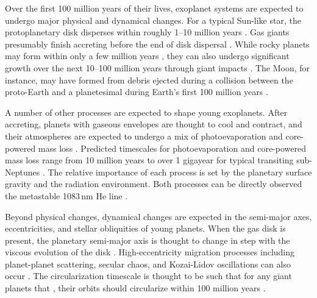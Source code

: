 \documentclass[12pt,twocolumn,tighten]{aastex63}
\begin{document}
Over the first 100 million years of their lives, exoplanet systems are
expected to undergo major physical and dynamical changes.  For a
typical Sun-like star, the protoplanetary disk disperses within
roughly 1--10 million years
\citep{mamajek_initial_2009,fedele_timescale_2010,dullemond_inner_2010,williams_protoplanetary_2011}.
Gas giants presumably finish accreting before the end of disk
dispersal \citep{pollack_formation_1996}.  While rocky planets may
form within only a few million years \citep{dauphas_hf-w-th_2011},
they can also undergo significant growth over the next 10--100 million
years through giant impacts \citep[{\it
e.g.},][]{kleine_hf-w_2009,konig_earths_2011,morbidelli_building_2012,raymond_terrestrial_2014}.
The Moon, for instance, may have formed from debris ejected during a
collision between the proto-Earth and a planetesimal during Earth's
first 100 million years
\citep{cameron_origin_1976,canup_origin_2001,touboul_late_2007}.

A number of other processes are expected to shape young exoplanets.
After accreting, planets with gaseous envelopes are thought to cool
and contract, and their atmospheres are expected to undergo a mix of
photoevaporation and core-powered mass loss \citep[{\it
e.g.},][]{Fortney_et_al_2007,Owen_Wu_2013,Fulton_et_al_2017,gupta_sculpting_2019,gupta_signatures_2020}.
Predicted timescales for photoevaporation and core-powered mass loss
range from 10 million years to over 1 gigayear for typical transiting
sub-Neptunes
\citep{ginzburg_superearth_2016,owen_evaporation_2017,king_euv_2020}.
The relative importance of each process is set by the planetary
surface gravity and the radiation environment.  Both processes can be
directly observed  the metastable 1083$\,$nm He line
\citep{spake_helium_2018,oklopcic_new_2018,mansfield_detection_2018}.

Beyond physical changes, dynamical changes are expected in the
semi-major axes, eccentricities, and stellar obliquities of young
planets.  When the gas disk is present, the planetary semi-major axis
is thought to change in step with the viscous evolution of the disk
\citep{lin_orbital_1996}.  High-eccentricity migration processes
including planet-planet scattering, secular chaos, and Kozai-Lidov
oscillations can also occur \citep[{\it
e.g.},][]{fabrycky_shrinking_2007,chatterjee_dynamical_2008,lithwick_secular_2014}.
The circularization timescale is thought to be such that for any giant
planets that , their orbits
should circularize within 100 million years
\citep{zahn_tidal_1977,bonomo_gaps_2017}.
\end{document}
